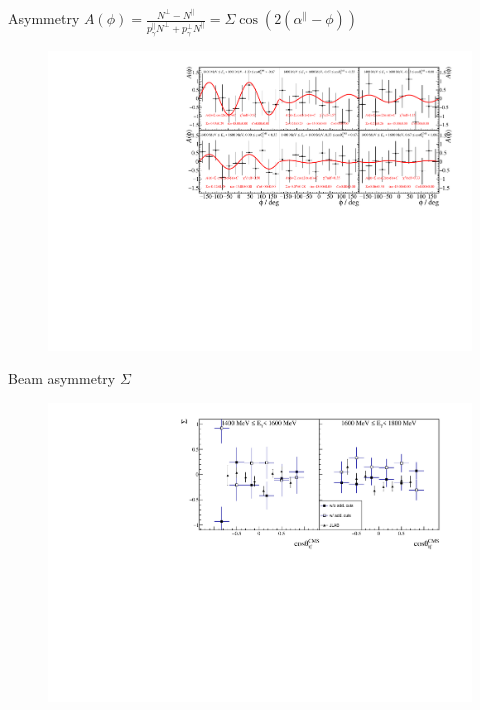 \documentclass[11pt,aspectratio=169,dvipsnames]{beamer}
\begin{document}
	\begin{frame}{Asymmetry $A(\phi)=\frac{N^\bot-N^\parallel}{p_\gamma^\parallel N^\bot+p_\gamma^\bot N^\parallel}=\Sigma \cos\left(2\left(\alpha^\parallel-\phi\right)\right)$ }
		\begin{figure}
			\includegraphics[width=\linewidth]{../../figs/hydrogen/asymmetry/ebin_0_fixalphaC.pdf}
		\end{figure}
	\end{frame}
	\begin{frame}{Beam asymmetry $\Sigma$}
		\begin{figure}
			\includegraphics[width=\linewidth]{../../figs/hydrogen/asymmetry/sigma.pdf}
		\end{figure}
	\end{frame}
\end{document}
